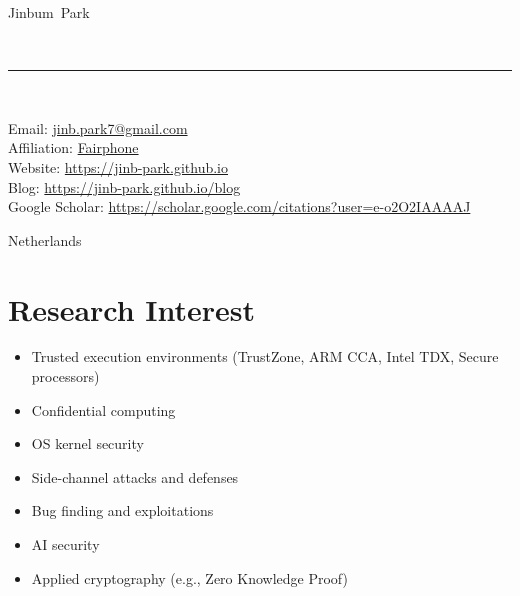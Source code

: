 \documentclass[10pt, a4paper]{article}
\makeatletter
\newcommand{\FirstName}{Jinbum}
\newcommand{\LastName}{Park}
\newcommand{\MyName}{\FirstName\ \LastName}
\newcommand{\Email}{jinb.park7@gmail.com}
\newcommand{\PersonalWebsite}{https://jinb-park.github.io}
\newcommand{\Address}{
  Netherlands
}
\makeatother
\begin{document}
\thispagestyle{empty}

\begin{minipage}[t]{0.7\textwidth}
{\fontsize{22pt}{0}\selectfont\MyName}
\end{minipage}
\\[-0.1cm]
\rule{\textwidth}{2pt}
\\[0.1cm]
\begin{minipage}[t]{0.7\textwidth}
    Email: \href{mailto:\Email}{\Email}
    \\
    Affiliation: \href{https://www.fairphone.com/}{Fairphone}
    \\
    Website: \href{\PersonalWebsite}{https://jinb-park.github.io}
    \\
    Blog: \href{https://jinb-park.github.io/blog}{https://jinb-park.github.io/blog}
    \\
    Google Scholar: \href{https://scholar.google.com/citations?user=e-o2O2IAAAAJ}{https://scholar.google.com/citations?user=e-o2O2IAAAAJ}
\end{minipage}
\begin{minipage}[t]{0.3\textwidth}
  \begin{flushright}
    \Address
  \end{flushright}
\end{minipage}

\section{Research Interest}

\begin{itemize}
  \item Trusted execution environments (TrustZone, ARM CCA, Intel TDX, Secure processors)
  \item Confidential computing
  \item OS kernel security
  \item Side-channel attacks and defenses
  \item Bug finding and exploitations
  \item AI security
  \item Applied cryptography (e.g., Zero Knowledge Proof)
\end{itemize}
\end{document}
